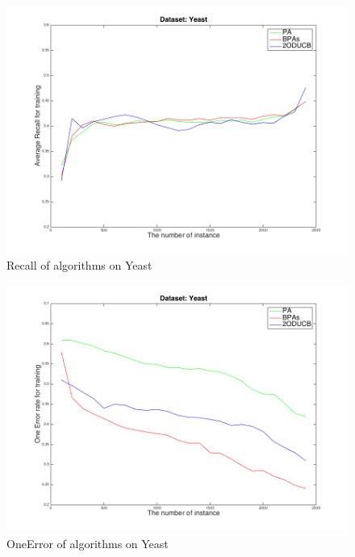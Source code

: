 \begin{figure}[h!]
\vspace{.2in}
\centerline{
\includegraphics[scale = 0.6]{fig05/ml/Recall_Yeast.png}}
\caption{Recall of algorithms on Yeast}
\label{pig:RY}
\end{figure}

\begin{figure}[h!]
\vspace{.2in}
\centerline{
\includegraphics[scale = 0.6]{fig05/ml/OneError_Yeast.png}}
\caption{OneError of algorithms on Yeast}
\label{pig:OEY}
\end{figure}


